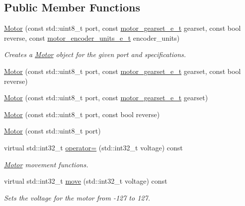 \subsection*{Public Member Functions}
\begin{DoxyCompactItemize}
\item 
\mbox{\hyperlink{classpros_1_1Motor_a5be9a41f9877208c887d5e2c081bc72e}{Motor}} (const std\+::uint8\+\_\+t port, const \mbox{\hyperlink{motors_8h_aa2f1c305c998abc3bf8dd1f76fa4da8b}{motor\+\_\+gearset\+\_\+e\+\_\+t}} gearset, const bool reverse, const \mbox{\hyperlink{motors_8h_a6677ba23760c558fd8b7b4e1e00a6123}{motor\+\_\+encoder\+\_\+units\+\_\+e\+\_\+t}} encoder\+\_\+units)
\begin{DoxyCompactList}\small\item\em Creates a \mbox{\hyperlink{classpros_1_1Motor}{Motor}} object for the given port and specifications. \end{DoxyCompactList}\item 
\mbox{\hyperlink{classpros_1_1Motor_a512050b652bf3034a21da12bf2b663ac}{Motor}} (const std\+::uint8\+\_\+t port, const \mbox{\hyperlink{motors_8h_aa2f1c305c998abc3bf8dd1f76fa4da8b}{motor\+\_\+gearset\+\_\+e\+\_\+t}} gearset, const bool reverse)
\item 
\mbox{\hyperlink{classpros_1_1Motor_aff27ad42b72a59c35e36a665bcd763a6}{Motor}} (const std\+::uint8\+\_\+t port, const \mbox{\hyperlink{motors_8h_aa2f1c305c998abc3bf8dd1f76fa4da8b}{motor\+\_\+gearset\+\_\+e\+\_\+t}} gearset)
\item 
\mbox{\hyperlink{classpros_1_1Motor_a822e0023951996ca7eff13ffe9cf953d}{Motor}} (const std\+::uint8\+\_\+t port, const bool reverse)
\item 
\mbox{\hyperlink{classpros_1_1Motor_a767b4ad39251b8e8411fae17a35b24ba}{Motor}} (const std\+::uint8\+\_\+t port)
\item 
virtual std\+::int32\+\_\+t \mbox{\hyperlink{classpros_1_1Motor_a4cf8a9518eb6cd268d27151f0df7fd38}{operator=}} (std\+::int32\+\_\+t voltage) const
\begin{DoxyCompactList}\small\item\em \mbox{\hyperlink{classpros_1_1Motor}{Motor}} movement functions. \end{DoxyCompactList}\item 
virtual std\+::int32\+\_\+t \mbox{\hyperlink{classpros_1_1Motor_a7ea9aedd4e12844be2584dc3f4b7a4bf}{move}} (std\+::int32\+\_\+t voltage) const
\begin{DoxyCompactList}\small\item\em Sets the voltage for the motor from -\/127 to 127. \end{DoxyCompactList}\item 

\end{DoxyCompactItemize}
